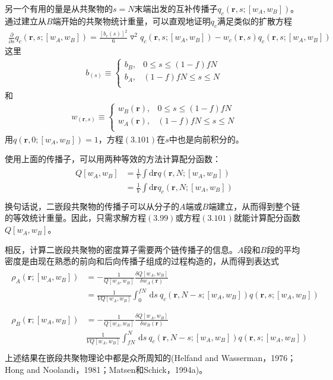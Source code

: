 另一个有用的量是从共聚物的$s=N$末端出发的互补传播子$q_c(\mathbf{r},s;[w_A,w_B])$。通过建立从$B$端开始的共聚物统计重量，可以直观地证明$q_c$满足类似的扩散方程
\begin{gather}
\frac{\partial}{\partial s}q_c(\mathbf{r},s;[w_A,w_B])=\frac{[b_c(s)]^2}{6}\triangledown ^2q_c(\mathbf{r},s;[w_A,w_B])-w_c(\mathbf{r},s)q_c(\mathbf{r},s;[w_A,w_B])
\end{gather}
这里
\begin{gather}
b_(s)\equiv
\begin{cases}
b_B, & 0\leq s \leq (1-f)fN \\
b_A, & (1-f)fN \leq s \leq N\\
\end{cases}
\end{gather}
和
\begin{gather}
w_(\mathbf{r},s)\equiv
\begin{cases}
w_B(\mathbf{r}), & 0\leq s \leq (1-f)fN \\
w_A(\mathbf{r}), & (1-f)fN \leq s \leq N\\
\end{cases}
\end{gather}
用$q(\mathbf{r},0;[w_A,w_B])=1$，方程$(3.101)$在$s$中也是向前积分的。		

使用上面的传播子，可以用两种等效的方法计算配分函数：
\begin{gather}
\begin{align}
Q[w_A,w_B] & = \frac{1}{V}\int \mathrm{d}\mathbf{r}q(\mathbf{r},N;[w_A,w_B]) \\
&=\frac{1}{V}\int \mathrm{d}\mathbf{r}q_c(\mathbf{r},N;[w_A,w_B]) \\
\end{align}	
\end{gather}
换句话说，二嵌段共聚物的传播子可以从分子的$A$端或$B$端建立，从而得到整个链的等效统计重量。因此，只需求解方程$(3.99)$或方程$(3.101)$就能计算配分函数$Q[w_A,w_B]$。

相反，计算二嵌段共聚物的密度算子需要两个链传播子的信息。$A$段和$B$段的平均密度是由现在熟悉的前向和后向传播子组成的过程构造的，从而得到表达式
\begin{gather}
\begin{align}
\rho _A(\mathbf{r};[w_A,w_B]) & =-\frac{1}{Q[w_A,w_B]}	\frac{\delta Q[w_A,w_B]}{\delta w_A(\mathbf{r})} \\
& =\frac{1}{VQ[w_A,w_B]} \int _{0}^{fN}\,\mathrm{d}s~q_c(\mathbf{r},N-s;[w_A,w_B])q(\mathbf{r},s;[w_A,w_B]) \\
\end{align}	
\end{gather}
\begin{gather}
\begin{align}
\rho _B(\mathbf{r};[w_A,w_B]) & =-\frac{1}{Q[w_A,w_B]}	\frac{\delta Q[w_A,w_B]}{\delta w_B(\mathbf{r})} \\
& \frac{1}{VQ[w_A,w_B]} \int _{fN}^{N}\,\mathrm{d}s~q_c(\mathbf{r},N-s;[w_A,w_B])q(\mathbf{r},s;[w_A,w_B]) \\
\end{align}	
\end{gather}
上述结果在嵌段共聚物理论中都是众所周知的(Helfand and Wasserman，1976；Hong and Noolandi，1981；Matsen和Schick，1994a)。

